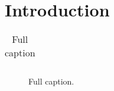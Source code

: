\documentclass[pdf,12pt,report,strict]{SANDreport}
\begin{document}
% 
\SANDmain		%

\chapter{Introduction}\label{Intro}

\begin{table}[ht]
  \centering
  \caption[Short Title]{Full caption}
  \bigskip

  \begin{tabular}{|l|c|l|c|}
  \end{tabular}
  \label{tab:1}
\end{table}

\begin{figure}[ht]
  \centering
  \caption{Full caption.}
  \label{fig:1}
\end{figure}



% 
\clearpage
\providecommand*{\phantomsection}{}
\phantomsection
{}




% 
\appendix
\chapter{}


\begin{SANDdistribution}[NM]%

  \SANDdistExternal{}{}
  \bigskip


  \SANDdistInternal{}{}{}{}

  \SANDdistInternalM{}{}{}{}
\end{SANDdistribution}


\end{document}
